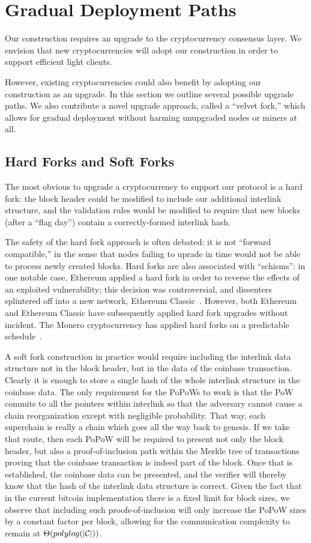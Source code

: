 \section{Gradual Deployment Paths}
\label{sec:forks}
Our construction requires an upgrade to the cryptocurrency consensus layer.
We envision that new cryptocurrencies will adopt our construction in order to support efficient light clients.

However, existing cryptocurrencies could also benefit by adopting our construction as an upgrade.
In this section we outline several possible upgrade paths. We also contribute a novel upgrade approach, called a ``velvet fork,'' which allows for gradual deployment without harming unupgraded nodes or miners at all.

\subsection{Hard Forks and Soft Forks}
The most obvious to upgrade a cryptocurrency to support our protocol is a hard fork: the block header could be modified to include our additional interlink structure, and the validation rules would be modified to require that new blocks (after a ``flag day'') contain a correctly-formed interlink hash.

The safety of the hard fork approach is often debated: it is not ``forward compatible,'' in the sense that nodes failing to uprade in time would not be able to process newly created blocks. Hard forks are also associated with ``schisms'': in one notable case, Ethereum applied a hard fork in order to reverse the effects of an exploited vulnerability; this decision was controversial, and dissenters splintered off into a new network, Ethereum Classic~\cite{daofork}. However, both Ethereum and Ethereum Classic have subsequently applied hard fork upgrades without incident. The Monero cryptocurrency has applied hard forks on a predictable schedule~\cite{monerohardforks}.

  A soft fork construction in practice would require including the interlink data structure
not in the block header, but in the data of the coinbase transaction.  Clearly
it is enough to store a single hash of the whole interlink structure in the
coinbase data. The only requirement for the PoPoWs to work is that the
PoW commits to all the pointers within interlink so that the adversary cannot
cause a chain reorganization except with negligible probability. That way, each
superchain is really a chain which goes all the way back to genesis. If we take
that route, then each PoPoW will be required to present not only the block
header, but also a proof-of-inclusion path within the Merkle tree of
transactions proving that the coinbase transaction is indeed part of the block.
Once that is established, the coinbase data can be presented, and the verifier
will thereby know that the hash of the interlink data structure is correct.
Given the fact that in the current bitcoin implementation there is a fixed
limit for block sizes, we observe that including such proofs-of-inclusion will
only increase the PoPoW sizes by a constant factor per block, allowing for the
communication complexity to remain at $\Theta(polylog(|\mathcal{C}|))$.


